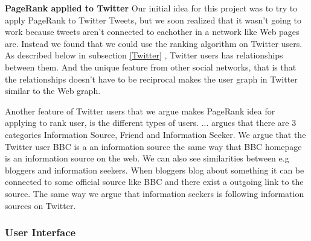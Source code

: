 



{\bf PageRank applied to Twitter}\newline %
Our initial idea for this project was to try to apply PageRank to Twitter Tweets, but we soon realized that it wasn't going to work because tweets aren't connected to eachother in a network like Web pages are. Instead we found that we could use the ranking algorithm on Twitter users. As described below in subsection \ref{Twitter} , Twitter users has relationships between them. And the unique feature from other social networks, that is that the relationships doesn't have to be reciprocal makes the user graph in Twitter similar to the Web graph. 

Another feature of Twitter users that we argue makes PageRank idea for applying to rank user, is the different types of users.  ... argues that there are 3 categories Information Source, Friend and Information Seeker. We argue that the Twitter user BBC is a an information source the same way that BBC homepage is an information source on the web. We can also see similarities between e.g bloggers and information seekers. When bloggers blog about something it can be connected to some official source like BBC and there exist a outgoing link to the source. The same way we argue that information seekers is following information sources on Twitter.


\subsubsection{User Interface}

